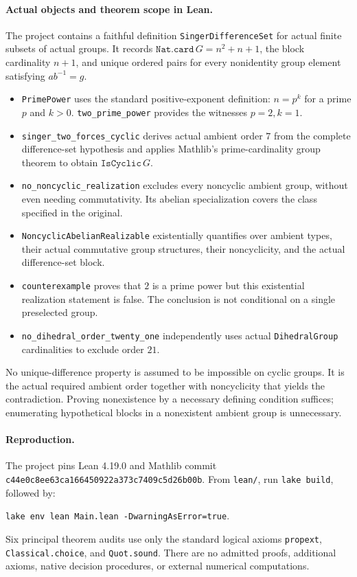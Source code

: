 \documentclass[11pt]{article}
\begin{document}
\paragraph{Actual objects and theorem scope in Lean.}
The project contains a faithful definition
\texttt{SingerDifferenceSet} for actual finite subsets of actual groups. It records \(\texttt{Nat.card}\,G=n^2+n+1\), the block cardinality \(n+1\), and unique ordered pairs for every nonidentity group element satisfying \(ab^{-1}=g\).
\begin{itemize}
\item \texttt{PrimePower} uses the standard positive-exponent definition: \(n=p^k\) for a prime \(p\) and \(k>0\). \texttt{two\_prime\_power} provides the witnesses \(p=2,k=1\).
\item \texttt{singer\_two\_forces\_cyclic} derives actual ambient order \(7\) from the complete difference-set hypothesis and applies Mathlib's prime-cardinality group theorem to obtain \(\texttt{IsCyclic}\,G\).
\item \texttt{no\_noncyclic\_realization} excludes every noncyclic ambient group, without even needing commutativity. Its abelian specialization covers the class specified in the original.
\item \texttt{NoncyclicAbelianRealizable} existentially quantifies over ambient types, their actual commutative group structures, their noncyclicity, and the actual difference-set block.
\item \texttt{counterexample} proves that \(2\) is a prime power but this existential realization statement is false. The conclusion is not conditional on a single preselected group.
\item \texttt{no\_dihedral\_order\_twenty\_one} independently uses actual \texttt{DihedralGroup} cardinalities to exclude order \(21\).
\end{itemize}
No unique-difference property is assumed to be impossible on cyclic groups. It is the actual required ambient order together with noncyclicity that yields the contradiction. Proving nonexistence by a necessary defining condition suffices; enumerating hypothetical blocks in a nonexistent ambient group is unnecessary.

\paragraph{Reproduction.}
The project pins Lean 4.19.0 and Mathlib commit
\texttt{c44e0c8ee63ca166450922a373c7409c5d26b00b}.
From \texttt{lean/}, run \texttt{lake build}, followed by:
\begin{center}
\small\texttt{lake env lean Main.lean -DwarningAsError=true}.
\end{center}
Six principal theorem audits use only the standard logical axioms
\texttt{propext}, \texttt{Classical.choice}, and \texttt{Quot.sound}.
There are no admitted proofs, additional axioms, native decision procedures, or external numerical computations.
\end{document}
